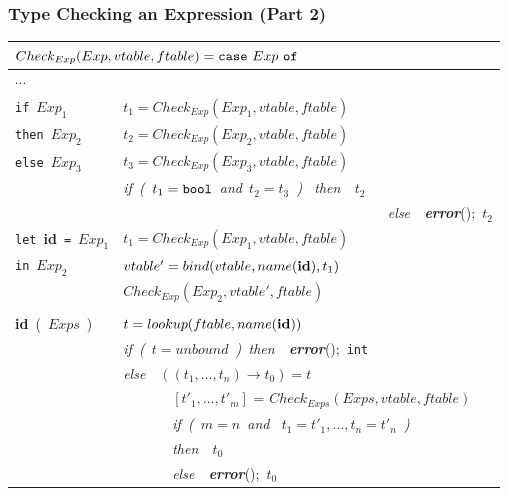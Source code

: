 \documentclass{beamer}
\begin{document}
\begin{frame}
\frametitle{Type Checking an Expression (Part 2)}

\renewcommand{\arraystretch}{0.9}
\begin{tabular}{|l|l|}\hline
\multicolumn{2}{|l|}{$ Check_{Exp}(Exp,vtable,ftable) =
  \mbox{\tt case}~Exp~\mbox{\tt of}$} \\\hline

$\cdots$ & \\\hline

{\tt if}~$Exp_1$
        & $t_1 = Check_{Exp}(Exp_1,vtable,ftable)$ \\
{\tt then}~$Exp_2$
        & $t_2 = Check_{Exp}(Exp_2,vtable,ftable)$ \\
{\tt else}~$Exp_3$
        & $t_3 = Check_{Exp}(Exp_3,vtable,ftable)$ \\
        & {\em if~(~$t_1 = \mbox{\tt bool}$~and~$t_2 = t_3$~)~ then~~$t_2$} \\
        & {\em ~~~~~~~~~~~~~~~~~~~~~~~~~~~~~~~~~~~~~else~~\alert{\mbox{\bf error}}}();~$t_2$ \\\hline

{\tt let}~{\bf id}~{\tt =}~$Exp_1$
        & $t_1 = Check_{Exp}(Exp_1,vtable,ftable)$ \\
{\tt in}~$Exp_2$
        & $vtable' = bind(vtable,name(\mbox{\bf id}),t_1)$ \\
        & $Check_{Exp}(Exp_2,vtable',ftable)$ \\\hline
        & \\
{\bf id}~(~$Exps$~)
        & $t = lookup(ftable,name(\mbox{\bf id}))$ \\
        & {\em if~(~$t = unbound$~)~then~~\mbox{\bf error}}();~{\tt int} \\
        & {\em else}~~$((t_1,\ldots,t_n)\rightarrow t_0) = t$ \\
        & ~~~~~~~$[t'_1,\ldots,t'_m]$ = $Check_{Exps}(Exps,vtable,ftable)$ \\
        & ~~~~~~~{\em if~(~$m=n$~and~ $t_1 = t'_1,\ldots,t_n = t'_n$~)} \\
        & ~~~~~~~{\em then~~$t_0$} \\
        & ~~~~~~~{\em else~~\alert{\mbox{\bf error}}}();~$t_0$ \\\hline

\end{tabular}

\end{frame}
\end{document}
